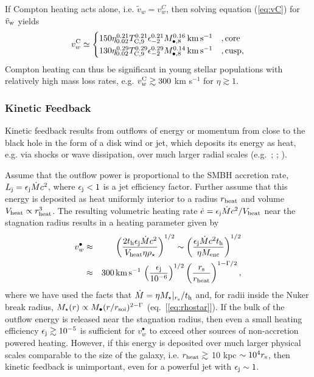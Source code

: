 \documentclass[usenatbib,fleqn]{mn2e}
\begin{document}
If Compton heating acts alone, i.e. $\tilde{v}_{w} = v_{w}^{C}$, then solving equation
(\ref{eq:vC}) for $\tilde{v}_{\rm w}$ yields
\begin{align} v_{w}^{\rm C} \simeq
  \begin{cases} 150 \eta_{0.02}^{0.21}T_{\rm
C,9}^{0.21}\epsilon_{-2}^{0.21} M_{\bullet,8}^{0.16}\,{\rm km\,s^{-1}}
&, \text{core}\\ 130 \eta_{0.02}^{0.29}T_{\rm
C,9}^{0.29}\epsilon_{-2}^{0.29} M_{\bullet,8}^{0.14}\,{\rm km\,s^{-1}}
&, \text{cusp},
  \end{cases}
  \label{eq:vC2}
\end{align} 
Compton heating can thus be significant in young stellar populations with relatively high mass loss rates, e.g. $v_{w}^{\rm C} \gtrsim 300$ km s$^{-1}$ for $\eta \gtrsim 1$.  


\subsubsection{Kinetic Feedback}

Kinetic feedback results from outflows of energy or momentum from close to the black hole in the form of a disk wind or jet, which deposits its energy as heat, e.g. via shocks or wave dissipation, over much larger radial scales (e.g.~\citealt{McNamara&Nulsen07}; \citealt{Novak+11}; \citealt{Gaspari+12}).  

Assume that the outflow power is proportional to the SMBH accretion rate, $L_{\rm j} =
\epsilon_{\rm j} \dot{M}c^{2}$, where $\epsilon_{\rm j} < 1$ is a jet efficiency factor.  Further assume that this energy is deposited as heat uniformly interior to a radius $r_{\rm heat}$ and volume $V_{\rm heat} \propto r_{\rm
heat}^{3}$.  The resulting volumetric heating rate $\dot{e} = \epsilon_{\rm
j}\dot{M}c^{2}/V_{\rm heat}$ near the stagnation radius results in a heating parameter given by
\begin{eqnarray} v_{w}^{\bullet} &\approx& \left(\frac{2t_{\rm
h}\epsilon_{\rm j}\dot{M}c^{2}}{V_{\rm heat}\eta
\rho_{\star}}\right)^{1/2} \sim \left(\frac{\epsilon_{\rm
j}\dot{M}c^{2}t_{\rm h}}{\eta M_{\rm enc}}\right)^{1/2} \nonumber \\
&\approx& 300\,{\rm km\,s^{-1}}\,\left(\frac{\epsilon_{\rm j}}{10^{-6}}\right)^{1/2}\left(\frac{r_{\rm s}}{r_{\rm
heat}}\right)^{1-\Gamma/2},
\label{eq:vjet}
\end{eqnarray} 
where we have used the facts that $\dot{M} = \eta M_{\star}|_{r_{\rm s}}/t_{\rm h}$ and, for radii inside the Nuker break radius, $M_{\star}(r) \propto
M_{\bullet}(r/r_{\rm soi})^{2-\Gamma}$ (eq.~[\ref{eq:rhostar}]).  If the bulk of the outflow energy is released near the stagnation radius, then even a small heating efficiency $\epsilon_{\rm j} \gtrsim
10^{-5}$ is sufficient for $v_{w}^{\bullet}$ to exceed other sources of non-accretion powered heating.  However, if this energy is deposited over much larger physical scales comparable to the size of the galaxy, i.e. $r_{\rm heat} \gtrsim $ 10 kpc $\sim 10^{4}r_{\rm s}$, then kinetic feedback is unimportant, even for a powerful jet with $\epsilon_{\rm j} \sim 1$.  
\end{document}
